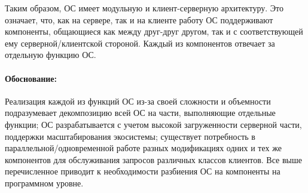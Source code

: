 Таким образом, ОС имеет модульную и клиент-серверную архитектуру. Это означает, что, как на сервере, так и на клиенте работу ОС поддерживают компоненты, общающиеся как между друг-друг другом, так и с соответствующей ему серверной/клиентской стороной.
Каждый из компонентов отвечает за отдельную функцию ОС.

\paragraph{Обоснование:} 
Реализация каждой из функций ОС из-за своей сложности и объемности подразумевает декомпозицию всей ОС на части, выполняющие отдельные функции; ОС разрабатывается с учетом высокой загруженности серверной части, поддержки масштабирования экосистемы; существует потребность в параллельной/одновременной работе разных модификациях одних и тех же компонентов для обслуживания запросов различных классов клиентов.
Все выше перечисленное приводит к необходимости разбиения ОС на компоненты на программном уровне.
